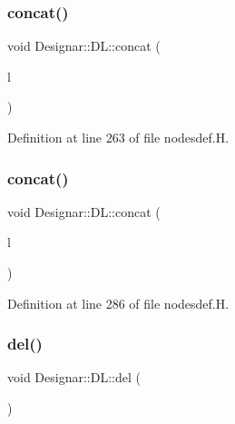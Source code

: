 \subsubsection{\texorpdfstring{concat()}{concat()}\hspace{0.1cm}{\footnotesize\ttfamily [1/2]}}
{\footnotesize\ttfamily void Designar\+::\+D\+L\+::concat (\begin{DoxyParamCaption}\item[{\hyperlink{class_designar_1_1_d_l}{DL} $\ast$}]{l }\end{DoxyParamCaption})\hspace{0.3cm}{\ttfamily [inline]}}



Definition at line 263 of file nodesdef.\+H.

\mbox{\label{class_designar_1_1_d_l_ad952d602d2beded2a8f922289fe16d7f}} 
\subsubsection{\texorpdfstring{concat()}{concat()}\hspace{0.1cm}{\footnotesize\ttfamily [2/2]}}
{\footnotesize\ttfamily void Designar\+::\+D\+L\+::concat (\begin{DoxyParamCaption}\item[{\hyperlink{class_designar_1_1_d_l}{DL} \&}]{l }\end{DoxyParamCaption})\hspace{0.3cm}{\ttfamily [inline]}}



Definition at line 286 of file nodesdef.\+H.

\mbox{\label{class_designar_1_1_d_l_affc0a48f00bd2ff8a6899c2a0c3d0ae3}} 
\subsubsection{\texorpdfstring{del()}{del()}}
{\footnotesize\ttfamily void Designar\+::\+D\+L\+::del (\begin{DoxyParamCaption}{ }\end{DoxyParamCaption})\hspace{0.3cm}{\ttfamily [inline]}}



